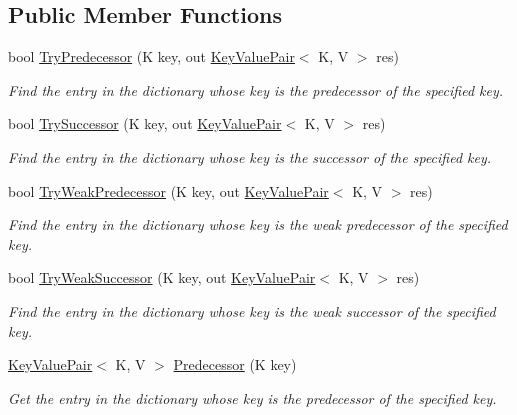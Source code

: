 \subsection*{Public Member Functions}
\begin{DoxyCompactItemize}
\item 
bool \hyperlink{class_c5_1_1_sorted_dictionary_base_a75aa96754b7a10aa668b84f401814f17}{Try\+Predecessor} (K key, out \hyperlink{struct_c5_1_1_key_value_pair}{Key\+Value\+Pair}$<$ K, V $>$ res)
\begin{DoxyCompactList}\small\item\em Find the entry in the dictionary whose key is the predecessor of the specified key. \end{DoxyCompactList}\item 
bool \hyperlink{class_c5_1_1_sorted_dictionary_base_ad961da8c436ee0ed12de0f7359cdb227}{Try\+Successor} (K key, out \hyperlink{struct_c5_1_1_key_value_pair}{Key\+Value\+Pair}$<$ K, V $>$ res)
\begin{DoxyCompactList}\small\item\em Find the entry in the dictionary whose key is the successor of the specified key. \end{DoxyCompactList}\item 
bool \hyperlink{class_c5_1_1_sorted_dictionary_base_acfec1258684a825166fd31f78e14671c}{Try\+Weak\+Predecessor} (K key, out \hyperlink{struct_c5_1_1_key_value_pair}{Key\+Value\+Pair}$<$ K, V $>$ res)
\begin{DoxyCompactList}\small\item\em Find the entry in the dictionary whose key is the weak predecessor of the specified key. \end{DoxyCompactList}\item 
bool \hyperlink{class_c5_1_1_sorted_dictionary_base_ad164c25186afa9d018f6843451a380cf}{Try\+Weak\+Successor} (K key, out \hyperlink{struct_c5_1_1_key_value_pair}{Key\+Value\+Pair}$<$ K, V $>$ res)
\begin{DoxyCompactList}\small\item\em Find the entry in the dictionary whose key is the weak successor of the specified key. \end{DoxyCompactList}\item 
\hyperlink{struct_c5_1_1_key_value_pair}{Key\+Value\+Pair}$<$ K, V $>$ \hyperlink{class_c5_1_1_sorted_dictionary_base_af792bcd2b393dccc9c818d0446a2773b}{Predecessor} (K key)
\begin{DoxyCompactList}\small\item\em Get the entry in the dictionary whose key is the predecessor of the specified key. \end{DoxyCompactList}\item 

\end{DoxyCompactItemize}
